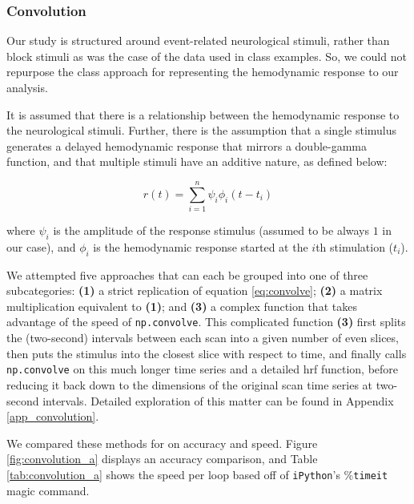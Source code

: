 \subsubsection{Convolution}
\par \indent Our study is structured around event-related neurological 
stimuli, rather than block stimuli as was the case of the data used in 
class examples. So, we could not repurpose the class approach for 
representing the hemodynamic response to our analysis. 

\par It is assumed that there is a relationship between the hemodynamic 
response to the neurological stimuli. Further, there is the assumption that 
a single stimulus generates a delayed hemodynamic response that mirrors a 
double-gamma function, and that multiple stimuli have an additive nature, as 
defined below: 

\begin{equation} \label{eq:convolve}
r(t)= \sum_{i=1}^n \psi_{i} \phi_{i}(t-t_i)
\end{equation}

\noindent where $\psi_i$ is the amplitude of the response stimulus (assumed to 
be always $1$ in our case), and $\phi_{i}$ is the hemodynamic response started 
at the $i$th stimulation ($t_i$).

\par We attempted five approaches that can each be grouped into one of three 
subcategories: \textbf{(1)} a strict replication of equation 
\ref{eq:convolve}; \textbf{(2)} a matrix multiplication equivalent to 
\textbf{(1)}; and \textbf{(3)} a complex function that takes advantage of the 
speed of \texttt{np.convolve}. This complicated function \textbf{(3)} first 
splits the (two-second) intervals between each scan into a given number of 
even slices, then puts the stimulus into the closest slice with respect to 
time, and finally calls \texttt{np.convolve} on this much longer time series 
and a detailed hrf function, before reducing it back down to the dimensions of 
the original scan time series at two-second intervals. Detailed exploration of 
this matter can be found in Appendix \ref{app_convolution}.

We compared these methods for on accuracy and speed. Figure 
\ref{fig:convolution_a} displays an accuracy comparison, and Table 
\ref{tab:convolution_a} shows the speed per loop based off of 
\texttt{iPython}'s \%\texttt{timeit} magic command.



